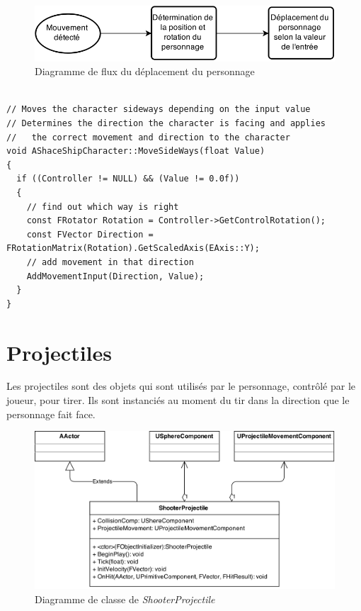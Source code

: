 \documentclass[11pt, a4paper, oneside]{article}
\begin{document}
\begin{figure}[h]
	\begin{center}
	\includegraphics[width=\textwidth]{MovementFlow}
	\caption{Diagramme de flux du déplacement du personnage}
	\label{fig:movementflow}
	\end{center}
\end{figure}

\lstset{language=C++}
\begin{lstlisting}[frame=single, caption={Gestion des mouvement latéraux}, captionpos=b, label=lst:gstmvntlat]  % Start your code-block

// Moves the character sideways depending on the input value
// Determines the direction the character is facing and applies
//   the correct movement and direction to the character
void AShaceShipCharacter::MoveSideWays(float Value)
{
  if ((Controller != NULL) && (Value != 0.0f))
  {
    // find out which way is right
    const FRotator Rotation = Controller->GetControlRotation();
    const FVector Direction = FRotationMatrix(Rotation).GetScaledAxis(EAxis::Y);
    // add movement in that direction
    AddMovementInput(Direction, Value);
  }
}
\end{lstlisting}

\newpage
\section{Projectiles}
Les projectiles sont des objets qui sont utilisés par le personnage, contrôlé par le joueur, pour tirer. Ils sont instanciés au moment du tir dans la direction que le personnage fait face.

\begin{figure}[htp]
	\begin{center}
	\includegraphics[width=\textwidth]{ProjectileUML}
	\caption{Diagramme de classe de \emph{ShooterProjectile}}
	\label{fig:projectileuml}
	\end{center}
\end{figure}
\end{document}
